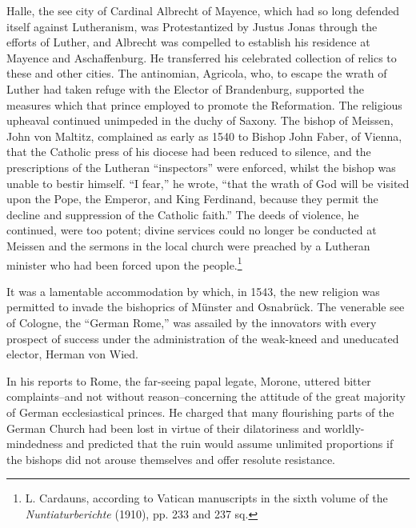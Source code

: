 Halle, the see city of Cardinal Albrecht of Mayence, which had so
long defended itself against Lutheranism, was Protestantized by Justus
Jonas through the efforts of Luther, and Albrecht was compelled to
establish his residence at Mayence and Aschaffenburg. He transferred
his celebrated collection of relics to these and other cities. The antinomian,
Agricola, who, to escape the wrath of Luther had taken refuge
with the Elector of Brandenburg, supported the measures which
that prince employed to promote the Reformation. The religious upheaval
continued unimpeded in the duchy of Saxony. The bishop
of Meissen, John von Maltitz, complained as early as 1540 to Bishop
John Faber, of Vienna, that the Catholic press of his diocese had been
reduced to silence, and the prescriptions of the Lutheran “inspectors”
were enforced, whilst the bishop was unable to bestir himself. “I fear,”
he wrote, “that the wrath of God will be visited upon the Pope, the
Emperor, and King Ferdinand, because they permit the decline and
suppression of the Catholic faith.” The deeds of violence, he continued,
were too potent; divine services could no longer be conducted
at Meissen and the sermons in the local church were preached by a
Lutheran minister who had been forced upon the people.\footnote
{L. Cardauns, according to Vatican manuscripts in the sixth volume of the \textit{Nuntiaturberichte}
(1910), pp. 233 and 237 sq.}

It was a lamentable accommodation by which, in 1543, the new
religion was permitted to invade the bishoprics of Münster and Osnabrück.
The venerable see of Cologne, the “German Rome,” was assailed
by the innovators with every prospect of success under the administration
of the weak-kneed and uneducated elector, Herman von
Wied.

In his reports to Rome, the far-seeing papal legate, Morone, uttered
bitter complaints--and not without reason--concerning the attitude
of the great majority of German ecclesiastical princes. He charged
that many flourishing parts of the German Church had been lost in
virtue of their dilatoriness and worldly-mindedness and predicted that
the ruin would assume unlimited proportions if the bishops did not
arouse themselves and offer resolute resistance.

